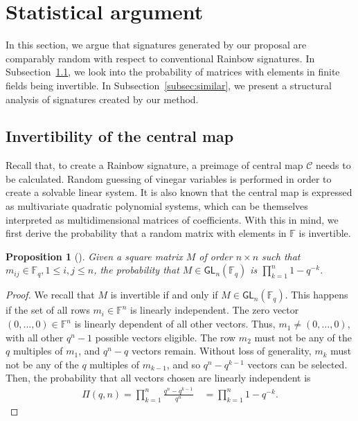 \documentclass[12pt, a4paper, oneside]{memoir}
\newtheorem{proposition}[theorem]{Proposition}
\theoremstyle{definition}
\begin{document}
\section{Statistical argument}\label{sec:stats}

In this section, we argue that signatures generated by our proposal are comparably random with respect to conventional Rainbow signatures. In Subsection~\ref{subsec:invert}, we look into the probability of matrices with elements in finite fields being invertible. In Subsection~\ref{subsec:similar}, we present a structural analysis of signatures created by our method.

\subsection{Invertibility of the central map}\label{subsec:invert}

Recall that, to create a Rainbow signature, a preimage of central map $\mathcal{C}$ needs to be calculated. Random guessing of vinegar variables is performed in order to create a solvable linear system. It is also known that the central map is expressed as multivariate quadratic polynomial systems, which can be themselves interpreted as multidimensional matrices of coefficients. With this in mind, we first derive the probability that a random matrix with elements in $\mathbb{F}$ is invertible.

\begin{proposition}[{\cite[Remark~13.2.14]{Mullen:2013}}]
  Given a square matrix $M$ of order $n \times n$ such that $m_{ij} \in \mathbb{F}_{q}, 1 \leq i, j \leq n$, the probability that $M \in \mathsf{GL}_{n}(\mathbb{F}_{q})$ is $\prod_{k = 1}^{n} 1 - q^{-k}$.
\end{proposition}
\begin{proof}
  We recall that $M$ is invertible if and only if $M \in \mathsf{GL}_{n}(\mathbb{F}_{q})$. This happens if the set of all rows $m_{i} \in \mathbb{F}^{n}$ is linearly independent. The zero vector $(0, \dots, 0) \in \mathbb{F}^{n}$ is linearly dependent of all other vectors. Thus, $m_{1} \neq (0, \dots, 0)$, with all other $q^{n} - 1$ possible vectors eligible. The row $m_{2}$ must not be any of the $q$ multiples of $m_{1}$, and $q^{n} - q$ vectors remain. Without loss of generality, $m_{k}$ must not be any of the $q$ multiples of $m_{k - 1}$, and so $q^{n} - q^{k - 1}$ vectors can be selected. Then, the probability that all vectors chosen are linearly independent is
  \begin{align}
    \Pi(q, n) = \prod_{k = 1}^{n} \frac{q^{n} - q^{k - 1}}{q^{n}} \quad
      = \prod_{k = 1}^{n} 1 - q^{-k}.
  \end{align}
\end{proof}
\end{document}
